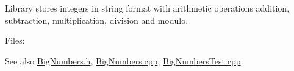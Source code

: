 Library stores integers in string format with arithmetic operations addition, subtraction, multiplication, division and modulo.

Files\+: \begin{DoxySeeAlso}{See also}
\mbox{\hyperlink{BigNumbers_8h}{Big\+Numbers.\+h}}, \mbox{\hyperlink{BigNumbers_8cpp}{Big\+Numbers.\+cpp}}, \mbox{\hyperlink{BigNumbersTest_8cpp}{Big\+Numbers\+Test.\+cpp}} 
\end{DoxySeeAlso}
